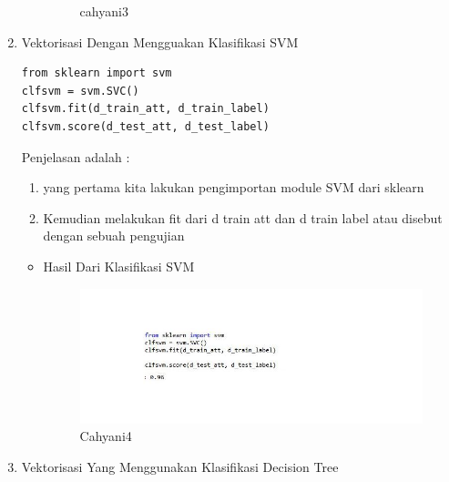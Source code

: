 \begin{enumerate}
\begin{itemize}
\begin{figure}[!hbtp]
\caption{cahyani3}
\label{cahyani3}
\end{figure}
\par
\par
\par
\end{itemize}
\par
\par
\item Vektorisasi Dengan Mengguakan Klasifikasi SVM
\par
\begin{lstlisting}
from sklearn import svm
clfsvm = svm.SVC()
clfsvm.fit(d_train_att, d_train_label)
clfsvm.score(d_test_att, d_test_label)
\end{lstlisting}
\par Penjelasan adalah :
\begin{enumerate}
\item yang pertama kita lakukan pengimportan module SVM dari sklearn
\item Kemudian melakukan fit dari d train att dan d train label atau disebut dengan sebuah  pengujian
\end{enumerate}
\par
\begin{itemize}
\item Hasil Dari Klasifikasi SVM
\begin{figure}[!hbtp]
\centering
\includegraphics[scale=0.3]{figures/Cahyani4.jpg}
\caption{Cahyani4}
\label{Cahyani4}
\end{figure}
\par
\par
\par
\end{itemize}
\par
\par
\par
\item Vektorisasi Yang Menggunakan Klasifikasi Decision Tree
\par
\begin{lstlisting}

\end{lstlisting}
\end{enumerate}
